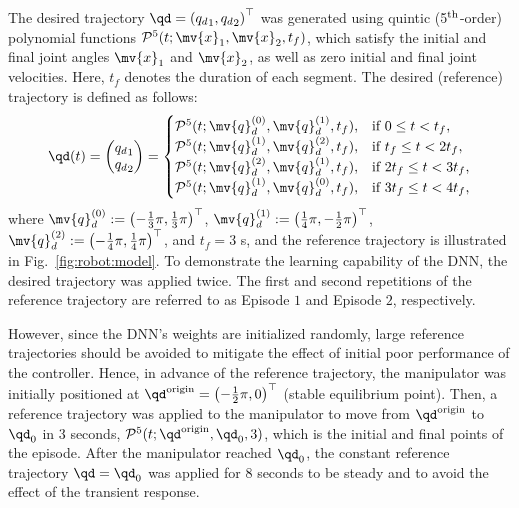 \documentclass[lettersize,journal]{IEEEtran}
\begin{document}
The desired trajectory $\qd=\left({q_d}_1,{q_d}_2\right)^\top $ was generated using quintic (5$\textsuperscript{th}$-order) polynomial functions $\mathcal{P}^5(t;\mv{x}_1,\mv{x}_2,t_f)$, which satisfy the initial and final joint angles $\mv{x}_1$ and $\mv{x}_2$, as well as zero initial and final joint velocities. 
Here, $t_f$ denotes the duration of each segment.
The desired (reference) trajectory is defined as follows:
\begin{equation}
    \qd(t) 
    =
    \begin{pmatrix}
        {q_d}_1
        \\
        {q_d}_2
    \end{pmatrix}
    =
    \begin{cases}
    \mathcal{P}^5(t;\mv{q}_d^{(0)},\mv{q}_d^{(1)},t_f),
        &
        \text{if } 0 \le t < t_f 
        ,
        \\
    \mathcal{P}^5(t;\mv{q}_d^{(1)},\mv{q}_d^{(2)},t_f),
        &
        \text{if } t_f \le t < 2t_f 
        ,
        \\
    \mathcal{P}^5(t;\mv{q}_d^{(2)},\mv{q}_d^{(1)},t_f),
        & 
        \text{if } 2t_f \le t < 3t_f 
        ,
        \\
    \mathcal{P}^5(t;\mv{q}_d^{(1)},\mv{q}_d^{(0)},t_f),
        &    
        \text{if } 3t_f \le t < 4t_f 
        ,
        \\
    \end{cases}
    \label{eq:desired trajectory}
\end{equation}
where 
$
    \mv{q}_d^{(0)}:=\left(-\tfrac{1}{3}\pi,\tfrac{1}{3}\pi\right)^\top
$, 
$
    \mv{q}_d^{(1)}:=\left(\tfrac{1}{4}\pi,-\tfrac{1}{2}\pi\right)^\top
$, 
$
    \mv{q}_d^{(2)}:=\left(-\tfrac{1}{4}\pi,\tfrac{1}{4}\pi\right)^\top
$, 
and $t_f=3$ s, and the reference trajectory is illustrated in Fig.~\ref{fig:robot:model}.
To demonstrate the learning capability of the DNN, the desired trajectory was applied twice. 
The first and second repetitions of the reference trajectory are referred to as Episode $1$ and Episode $2$, respectively.


However, since the DNN's weights are initialized randomly, large reference trajectories should be avoided to mitigate the effect of initial poor performance of the controller.
Hence, in advance of the reference trajectory, the manipulator was initially positioned at ${\qd}^{\rm{origin}}=\left(-\tfrac{1}{2}\pi,0\right)^\top$ (\ie stable equilibrium point).
Then, a reference trajectory was applied to the manipulator to move from ${\qd}^{\rm{origin}}$ to ${\qd}_0$ in 3 seconds, \ie $\mathcal{P}^5(t;{\qd}^{\rm{origin}},{\qd}_0,3)$, which is the initial and final points of the episode.
After the manipulator reached ${\qd}_0$, the constant reference trajectory $\qd={\qd}_0$ was applied for 8 seconds to be steady and to avoid the effect of the transient response.
\end{document}
